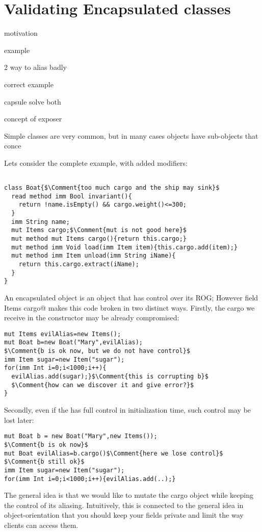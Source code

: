 \saveSpace
\section{Validating Encapsulated classes}
\label{s:encapsulated}
\saveSpace

motivation

example

2 way to alias badly

correct example

capsule solve both

concept of exposer





Simple classes are very common, but in many cases objects have
sub-objects that conce

Lets consider the
complete \Q@Boat@ example, with added modifiers:
\begin{lstlisting}

class Boat{$\Comment{too much cargo and the ship may sink}$
  read method imm Bool invariant(){
    return !name.isEmpty() && cargo.weight()<=300;
  }
  imm String name;
  mut Items cargo;$\Comment{mut is not good here}$
  mut method mut Items cargo(){return this.cargo;}
  mut method imm Void load(imm Item item){this.cargo.add(item);} 
  mut method imm Item unload(imm String iName){
    return this.cargo.extract(iName);
  }
}
\end{lstlisting}
An encapsulated object is an object
 that has control over its ROG;
However field \Q@mut Items cargo@ makes this code
broken in two distinct ways. Firstly, the cargo we receive in the constructor may
be already compromised:
\saveSpace
\begin{lstlisting}
mut Items evilAlias=new Items();
mut Boat b=new Boat("Mary",evilAlias);
$\Comment{b is ok now, but we do not have control}$
imm Item sugar=new Item("sugar");
for(imm Int i=0;i<1000;i++){
  evilAlias.add(sugar);}$\Comment{this is corrupting b}$
  $\Comment{how can we discover it and give error?}$
}
\end{lstlisting}
\saveSpace 
Secondly, even if the \Q@Boat@ has full control 
in initialization time, such control may be lost later:
\saveSpace
\begin{lstlisting}
mut Boat b = new Boat("Mary",new Items());
$\Comment{b is ok now}$
mut Boat evilAlias=b.cargo()$\Comment{here we lose control}$
$\Comment{b still ok}$
imm Item sugar=new Item("sugar");
for(imm Int i=0;i<1000;i++){evilAlias.add(..);}
\end{lstlisting}
\saveSpace
The general idea is that we would like to mutate the cargo object while keeping the control of its aliasing.
Intuitively, this is connected to the general idea in object-orientation that you should keep your fields private and limit the way clients can access them.

